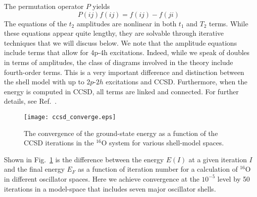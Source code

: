 \documentclass[twoside,12pt]{article}
\begin{document}
The permutation operator $P$ yields
\begin{equation}
P(ij)f(ij) = f(ij) - f(ji)
\end{equation}
The equations of the $t_2$ amplitudes are nonlinear in both $t_1$ and
$T_2$ terms. While these equations appear quite lengthy, they are 
solvable through iterative techniques that we will discuss below. 
We note that the amplitude equations include terms that allow for 
4p-4h excitations. Indeed, while we speak of doubles in terms of 
amplitudes, the class of diagrams involved in the theory include 
fourth-order terms. This is a very important difference 
and distinction between the shell model with up to 
$2p$-$2h$ excitations and CCSD. Furthermore, when
the energy is computed in CCSD, all terms are linked and connected. 
For further details, see Ref.~\cite{dean03}.
\begin{figure}[ht]
\begin{center}
\texttt{[image: ccsd\_converge.eps]}
\caption{The convergence of the ground-state energy
as a function of the CCSD iterations in the $^{16}$O system 
for various shell-model spaces.}
\label{converge_fig}
\end{center}
\end{figure}

Shown in Fig.~\ref{converge_fig} is the difference between the 
energy $E(I)$ at a given iteration $I$ and the final energy $E_F$
as a function of iteration number for a calculation 
of $^{16}$O in different oscillator spaces. 
Here we  achieve convergence at the $10^{-5}$ level
by 50 iterations in a model-space that includes seven major oscillator
shells. 
\end{document}
